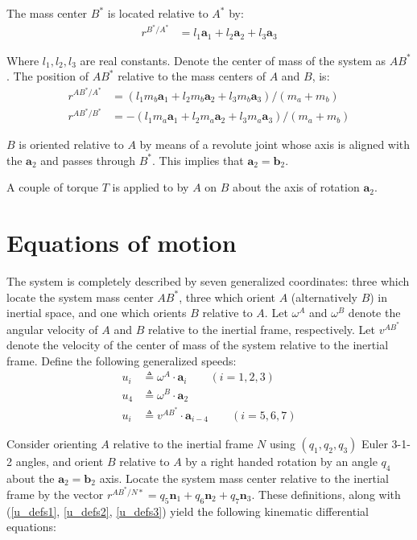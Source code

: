 \documentclass[letterpaper,11pt]{article}
\newcommand{\bs}[1]{ \boldsymbol{ #1 } }
\begin{document}
The mass center $B^*$ is located relative to $A^*$ by:
\begin{align*}
  r^{B^* / A^*} & = l_1 \bs{a}_1 + l_2 \bs{a}_2 + l_3 \bs{a}_3
\end{align*}

Where $l_1, l_2, l_3$ are real constants.  Denote the center of mass of the
system as $AB^*$. The position of $AB^*$ relative to the mass centers of $A$
and $B$, is:
\begin{align*}
  r^{AB^* / A^*} & = (l_1 m_b\bs{a}_1 + l_2 m_b\bs{a}_2 + l_3
  m_b\bs{a}_3)/(m_a+m_b)\\
  r^{AB^* / B^*} & =  -(l_1 m_a\bs{a}_1 + l_2 m_a\bs{a}_2 + l_3
  m_a\bs{a}_3)/(m_a+m_b)
\end{align*}

$B$ is oriented relative to $A$ by means of a revolute joint whose axis is
aligned with the $\bs{a}_2$ and passes through $B^*$.  This implies that
$\bs{a}_2 = \bs{b}_2$.

A couple of torque $T$ is applied to by $A$ on $B$ about the axis of rotation
$\bs{a}_2$.

\section*{Equations of motion}
The system is completely described by seven generalized coordinates: three which
locate the system mass center $AB^*$, three which orient $A$ (alternatively
$B$) in inertial space, and one which orients $B$ relative to $A$.  Let $\omega^A$ and
$\omega^B$ denote the angular velocity of $A$ and $B$ relative to the inertial
frame, respectively.  Let $v^{AB^*}$ denote the velocity of the center of mass
of the system relative to the inertial frame.  Define the following generalized
speeds:
\begin{align}
  u_i & \triangleq \omega^A \cdot \bs{a}_i  \qquad  (i = 1,2,3) \label{u_defs1} \\
  u_4 & \triangleq \omega^B \cdot \bs{a}_2 \label{u_defs2} \\
  u_i & \triangleq v^{AB^*} \cdot \bs{a}_{i-4} \qquad  (i = 5,6,7) \label{u_defs3}
\end{align}

Consider orienting $A$ relative to the inertial frame $N$ using $(q_1, q_2,
q_3)$ Euler 3-1-2 angles, and orient $B$ relative to $A$ by a right handed
rotation by an angle $q_4$ about the $\bs{a}_2 = \bs{b}_2$ axis. Locate the
system mass center relative to the inertial frame by the vector $r^{AB^*/N*} =
q_5\bs{n}_1 + q_6\bs{n}_2 + q_7\bs{n}_3$.  These definitions, along with
(\ref{u_defs1}, \ref{u_defs2}, \ref{u_defs3}) yield the following kinematic
differential equations:
\end{document}
